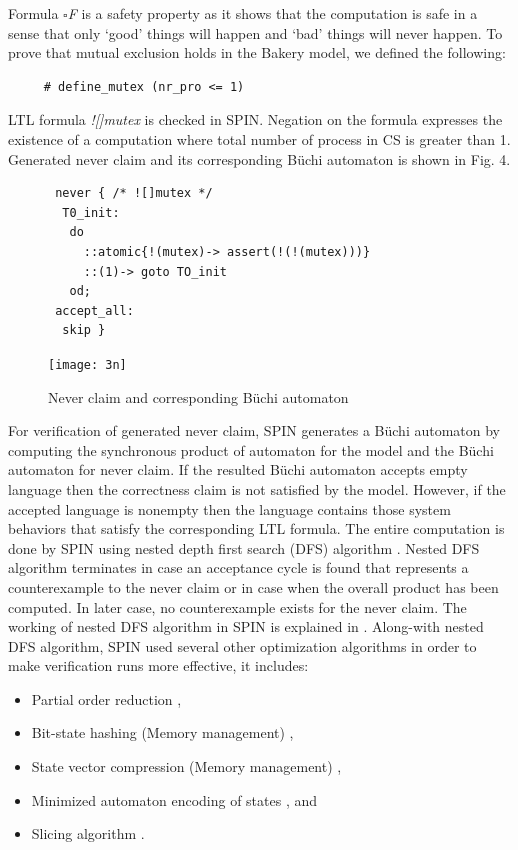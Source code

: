 \documentclass[conference]{IEEEtran}
\begin{document}
Formula $\square$\emph{F} is a safety property as it shows that the computation is safe in a sense that only `good' things will happen and `bad' 
things will never happen. To prove that mutual exclusion holds in the Bakery model, we defined the following:  

\begin{verbatim}
     # define_mutex (nr_pro <= 1)
\end{verbatim}

LTL formula \emph{![]mutex} is checked in SPIN. Negation on the formula expresses the existence of a computation where total number of process in 
CS is greater than 1. Generated never claim and its corresponding B\"uchi automaton is shown in Fig. 4.

\begin{figure}[!ht]
{\small \begin{verbatim}
 never { /* ![]mutex */
  T0_init:
   do
     ::atomic{!(mutex)-> assert(!(!(mutex)))}
     ::(1)-> goto TO_init
   od;
 accept_all:
  skip }
\end{verbatim}}\vspace{-5mm}
\centering\texttt{[image: 3n]}
\caption{Never claim and corresponding B\"uchi automaton} 
\end{figure}

For verification of generated never claim, SPIN generates a B\"uchi automaton by computing the synchronous product of automaton for the model 
and the B\"uchi automaton for never claim. If the resulted B\"uchi automaton accepts empty language then the correctness claim is not 
satisfied by the model. However, if the accepted language is nonempty then the language contains those system behaviors that satisfy the 
corresponding LTL formula. The entire computation is done by SPIN using nested depth first search (DFS) algorithm \cite{25}. Nested DFS algorithm 
terminates in case an acceptance cycle is found that represents a counterexample to the never claim or in case when the overall product has been
computed. In later case, no counterexample exists for the never claim. The working of nested DFS algorithm in SPIN is explained in \cite{26}. 
Along-with nested DFS algorithm, SPIN used several other optimization algorithms in order to make verification runs more effective, it includes:
\begin{itemize}
 \item Partial order reduction \cite{27},
 \item Bit-state hashing (Memory management) \cite{28},
 \item State vector compression (Memory management) \cite{29},
 \item Minimized automaton encoding of states \cite{30}, and
 \item Slicing algorithm \cite{31}.
\end{itemize}
\end{document}
